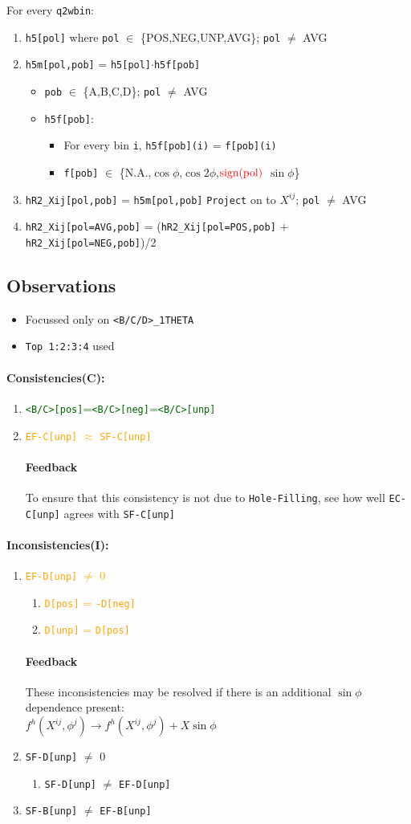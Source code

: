 \documentclass{article}
\newcommand{\code}[1]{\texttt{#1}}
\newcommand{\bi}{\begin{itemize}}
\newcommand{\ei}{\end{itemize}}
\newcommand{\be}{\begin{enumerate}}
\newcommand{\ee}{\end{enumerate}}
\newcommand{\atgr}[1]{\textcolor{darkgreen}{#1}}
\newcommand{\ator}[1]{\textcolor{orange}{#1}}
\newcommand{\fb}{\paragraph{Feedback}}
\numberwithin{equation}{subsection}
\begin{document}
For every \code{q2wbin}:
\begin{enumerate}
	\item \code{h5[pol]} where \code{pol} $\in$ \{POS,NEG,UNP,AVG\}; \code{pol} $\neq$ AVG
	\item \code{h5m[pol,pob]} = \code{h5[pol]}$\cdot$\code{h5f[pob]} 
		\begin{itemize}
		\item \code{pob} $\in$ \{A,B,C,D\}; \code{pol} $\neq$ AVG
		\item \code{h5f[pob]}:
			\begin{itemize}
			\item For every bin \code{i}, \code{h5f[pob](i)} = \code{f[pob](i)}
			\item \code{f[pob]} $\in$ \{N.A.,$\cos\phi$,$\cos 2\phi$,$\color{red}{\text{sign(pol)}}$ $\sin\phi$\}
			\end{itemize}
		\end{itemize}
	\item \code{hR2\_Xij[pol,pob]} = \code{h5m[pol,pob]} \code{Project} on to $X^{ij}$; \code{pol} $\neq$ AVG
	\item \code{hR2\_Xij[pol=AVG,pob]} = (\code{hR2\_Xij[pol=POS,pob]} + \code{hR2\_Xij[pol=NEG,pob]})/2
\end{enumerate}

\subsection{Observations}
\bi
	\item Focussed only on \code{<B/C/D>\_1THETA}
	\item \code{Top 1:2:3:4} used
\ei

\paragraph{\textbf{Consistencies(C)}:}
\be
	\item \atgr{\code{<B/C>[pos]}=\code{<B/C>[neg]}=\code{<B/C>[unp]}}
	\item \ator{\code{EF-C[unp]} $\approx$ \code{SF-C[unp]}}
		\fb
		To ensure that this consistency is not due to \code{Hole-Filling}, see how well \code{EC-C[unp]} agrees with \code{SF-C[unp]}
\ee

\paragraph{\textbf{Inconsistencies(I)}:}
\be
   	\item \ator{\code{EF-D[unp]} $\neq$ 0}
   	\be
   		\item \ator{\code{D[pos]} = \code{-D[neg]}}
   		\item \ator{\code{D[unp]} = \code{D[pos]}}
   	\ee
   	\fb
   	These inconsistencies may be resolved if there is an additional $\sin\phi$ dependence present:\\
   	$f^{h}(X^{ij},\phi^{j}) \rightarrow f^{h}(X^{ij},\phi^{j}) + X\sin\phi$
  	

   	\item \code{SF-D[unp]} $\neq$ 0
   	\be
   		\item \code{SF-D[unp]} $\neq$ \code{EF-D[unp]}
   	\ee
   	\item \code{SF-B[unp]} $\neq$ \code{EF-B[unp]}
\ee
\end{document}
